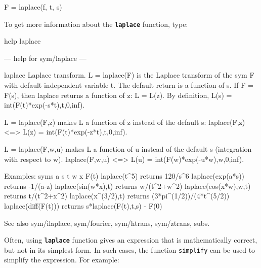 \documentclass{article}
\begin{document}
\begin{matlabcode}
F = laplace(f, t, s)
\end{matlabcode}


\begin{par}
\begin{flushleft}
To get more information about the \texttt{\textbf{laplace}} function, type:
\end{flushleft}
\end{par}

\begin{matlabcode}
help laplace
\end{matlabcode}
\begin{matlaboutput}
--- help for sym/laplace ---

 laplace Laplace transform.
    L = laplace(F) is the Laplace transform of the sym F with default
    independent variable t.  The default return is a function of s.
    If F = F(s), then laplace returns a function of z:  L = L(z).
    By definition, L(s) = int(F(t)*exp(-s*t),t,0,inf).
 
    L = laplace(F,z) makes L a function of z instead of the default s:
    laplace(F,z) <=> L(z) = int(F(t)*exp(-z*t),t,0,inf).
 
    L = laplace(F,w,u) makes L a function of u instead of the
    default s (integration with respect to w).
    laplace(F,w,u) <=> L(u) = int(F(w)*exp(-u*w),w,0,inf).
 
    Examples:
     syms a s t w x F(t)
     laplace(t^5)          returns   120/s^6
     laplace(exp(a*s))     returns   -1/(a-z)
     laplace(sin(w*x),t)   returns   w/(t^2+w^2)
     laplace(cos(x*w),w,t) returns   t/(t^2+x^2)
     laplace(x^(3/2),t)    returns   (3*pi^(1/2))/(4*t^(5/2))
     laplace(diff(F(t)))   returns   s*laplace(F(t),t,s) - F(0)
 
    See also sym/ilaplace, sym/fourier, sym/htrans, sym/ztrans, subs.
\end{matlaboutput}


\begin{par}
\begin{flushleft}
Often, using \texttt{\textbf{laplace}} function gives an expression that is mathematically correct, but not in its simplest form. In such cases, the function \texttt{simplify} can be used to simplify the expression. For example:
\end{flushleft}
\end{par}
\end{document}
